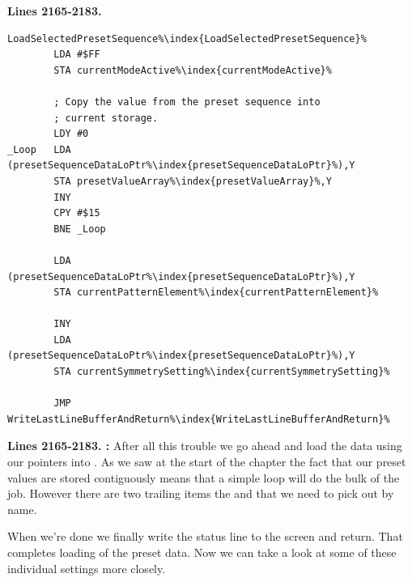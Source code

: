 \textbf{Lines 2165-2183. } 
\begin{lstlisting}[escapechar=\%]
LoadSelectedPresetSequence%\index{LoadSelectedPresetSequence}%    
        LDA #$FF
        STA currentModeActive%\index{currentModeActive}%

        ; Copy the value from the preset sequence into 
        ; current storage.
        LDY #0
_Loop   LDA (presetSequenceDataLoPtr%\index{presetSequenceDataLoPtr}%),Y
        STA presetValueArray%\index{presetValueArray}%,Y
        INY 
        CPY #$15
        BNE _Loop

        LDA (presetSequenceDataLoPtr%\index{presetSequenceDataLoPtr}%),Y
        STA currentPatternElement%\index{currentPatternElement}%

        INY 
        LDA (presetSequenceDataLoPtr%\index{presetSequenceDataLoPtr}%),Y
        STA currentSymmetrySetting%\index{currentSymmetrySetting}%

        JMP WriteLastLineBufferAndReturn%\index{WriteLastLineBufferAndReturn}%
\end{lstlisting}
\clearpage

\textbf{Lines 2165-2183. :} After all this trouble we go ahead and load the data using our pointers into 
. As we saw at the start of the chapter the fact that our preset values are stored contiguously means that a simple loop
will do the bulk of the job. However there are two trailing items the  and  that we need
to pick out by name. 

When we're done we finally write the status line to the screen and return. That completes loading of the preset data. Now we can take a look at some
of these individual settings more closely.

